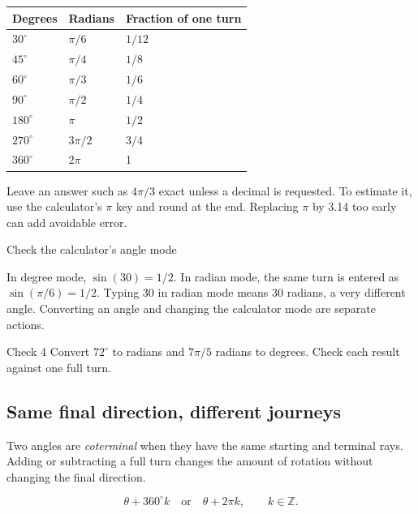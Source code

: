 \begin{center}\small\renewcommand{\arraystretch}{1.35}\begin{tabularx}{\linewidth}{ZZZ}\toprule
\textbf{Degrees} & \textbf{Radians} & \textbf{Fraction of one turn} \\
\midrule
\(30^\circ\) & \(\pi/6\) & \(1/12\) \\
\(45^\circ\) & \(\pi/4\) & \(1/8\) \\
\(60^\circ\) & \(\pi/3\) & \(1/6\) \\
\(90^\circ\) & \(\pi/2\) & \(1/4\) \\
\(180^\circ\) & \(\pi\) & \(1/2\) \\
\(270^\circ\) & \(3\pi/2\) & \(3/4\) \\
\(360^\circ\) & \(2\pi\) & 1 \\
\bottomrule\end{tabularx}\end{center}


Leave an answer such as \(4\pi/3\) exact unless a decimal is requested. To estimate it, use the calculator's \(\pi\) key and round at the end. Replacing \(\pi\) by 3.14 too early can add avoidable error.



\begin{moneaside}{Check the calculator's angle mode}

In degree mode, \(\sin(30)=1/2\). In radian mode, the same turn is entered as \(\sin(\pi/6)=1/2\). Typing 30 in radian mode means 30 radians, a very different angle. Converting an angle and changing the calculator mode are separate actions.


\end{moneaside}

\begin{monecheck}{Check 4}
Convert \(72^\circ\) to radians and \(7\pi/5\) radians to degrees. Check each result against one full turn.
\end{monecheck}

\subsection{Same final direction, different journeys}

Two angles are \emph{coterminal} when they have the same starting and terminal rays. Adding or subtracting a full turn changes the amount of rotation without changing the final direction.


\[\theta+360^\circ k\quad\text{or}\quad\theta+2\pi k,\qquad k\in\mathbb Z.\]

